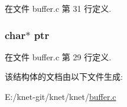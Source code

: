 在文件 buffer.\+c 第 31 行定义.

\hypertarget{struct__buffer__t_a935adc2e417a61d7eb6f04efb18ba031}{}
\subsubsection[{ptr}]{\setlength{\rightskip}{0pt plus 5cm}char$\ast$ ptr}\label{struct__buffer__t_a935adc2e417a61d7eb6f04efb18ba031}


在文件 buffer.\+c 第 29 行定义.



该结构体的文档由以下文件生成\+:\begin{DoxyCompactItemize}
\item 
E\+:/knet-\/git/knet/knet/\hyperlink{buffer_8c}{buffer.\+c}\end{DoxyCompactItemize}
